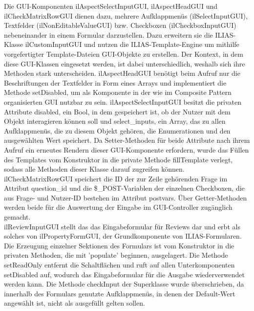 \documentclass[a4paper]{scrreprt}
\begin{document}
Die GUI-Komponenten ilAspectSelectInputGUI, ilAspectHeadGUI und ilCheckMatrixRowGUI dienen dazu, mehrere Aufklappmenüs (ilSelectInputGUI), Textfelder (ilNonEditableValueGUI) bzw. Checkboxen (ilCheckboxInputGUI) nebeneinander in einem Formular darzustellen. Dazu erweitern sie die ILIAS-Klasse ilCustomInputGUI und nutzen die ILIAS-Template-Engine um mithilfe vorgefertigter Template-Dateien GUI-Objekte zu erstellen. Der Kontext, in dem diese GUI-Klassen eingesetzt werden, ist dabei unterschiedlich, weshalb sich ihre Methoden stark unterscheiden. ilAspectHeadGUI benötigt beim Aufruf nur die Beschriftungen der Textfelder in Form eines Arrays und implementiert die Methode setDisabled, um als Komponente in der wie im Composite Pattern organisierten GUI nutzbar zu sein. ilAspectSelectInputGUI besitzt die privaten Attribute disabled, ein Bool, in dem gespeichert ist, ob der Nutzer mit dem Objekt interagieren können soll und select_inputs, ein Array, das zu allen Aufklappmenüs, die zu diesem Objekt gehören, die Enumerationen und den ausgewählten Wert speichert. Da Setter-Methoden für beide Attribute nach ihrem Aufruf ein erneutes Rendern dieser GUI-Komponente erfordern, wurde das Füllen des Templates vom Konstruktor in die private Methode fillTemplate verlegt, sodass alle Methoden dieser Klasse darauf zugreifen können. ilCheckMatrixRowGUI speichert die ID der zur Zeile gehörenden Frage im Attribut question_id und die \$_POST-Variablen der einzelnen Checkboxen, die aus Frage- und Nutzer-ID bestehen im Attribut postvars. Über Getter-Methoden werden beide für die Auswertung der Eingabe im GUI-Controller zugänglich gemacht.\\
ilReviewInputGUI stellt das das Eingabeformular für Reviews dar und erbt als solches von ilPropertyFormGUI, der Grundkomponente von ILIAS-Formularen. Die Erzeugung einzelner Sektionen des Formulars ist vom Konstruktor in die privaten Methoden, die mit 'populate' beginnen, ausgelagert. Die Methode setReadOnly entfernt die Schaltflächen und ruft auf allen Unterkomponenten setDisabled auf, wodurch das Eingabeformular für die Ausgabe wiederverwendet werden kann. Die Methode checkInput der Superklasse wurde überschrieben, da innerhalb des Formulars genutzte Aufklappmenüs, in denen der Default-Wert angewählt ist, nicht als ausgefüllt gelten sollen.
\end{document}

